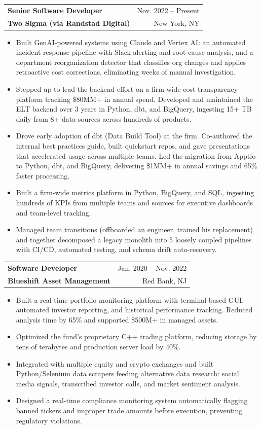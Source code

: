 \documentclass[letterpaper,11pt]{article}
\makeatletter
\newcommand{\resumeItem}[1]{
  \item\small{
    {#1 \vspace{-2pt}}
  }
}
\newcommand{\resumeSubheading}[4]{
  \vspace{-2pt}\item
    \begin{tabular*}{0.97\textwidth}[t]{l@{\extracolsep{\fill}}r}
      \textbf{\normalsize #1} & {\small #2} \\
      {\small\color{sectionblue}\textbf{#3}} & {\small #4} \\
    \end{tabular*}\vspace{-7pt}
}
\newcommand{\resumeItemListStart}{\begin{itemize}\setlength{\itemsep}{0pt}}
\newcommand{\resumeItemListEnd}{\end{itemize}\vspace{-5pt}}
\makeatother
\begin{document}
    \resumeSubheading
      {Senior Software Developer}{Nov. 2022 -- Present}
      {Two Sigma (via Randstad Digital)}{New York, NY}
      \resumeItemListStart
        \resumeItem{Built GenAI-powered systems using Claude and Vertex AI: an automated incident response pipeline with Slack alerting and root-cause analysis, and a department reorganization detector that classifies org changes and applies retroactive cost corrections, eliminating weeks of manual investigation.}
        \resumeItem{Stepped up to lead the backend effort on a firm-wide cost transparency platform tracking \$80MM+ in annual spend. Developed and maintained the ELT backend over 3 years in Python, dbt, and BigQuery, ingesting 15+ TB daily from 8+ data sources across hundreds of products.}
        \resumeItem{Drove early adoption of dbt (Data Build Tool) at the firm. Co-authored the internal best practices guide, built quickstart repos, and gave presentations that accelerated usage across multiple teams. Led the migration from Apptio to Python, dbt, and BigQuery, delivering \$1MM+ in annual savings and 65\% faster processing.}
        \resumeItem{Built a firm-wide metrics platform in Python, BigQuery, and SQL, ingesting hundreds of KPIs from multiple teams and sources for executive dashboards and team-level tracking.}
        \resumeItem{Managed team transitions (offboarded an engineer, trained his replacement) and together decomposed a legacy monolith into 5 loosely coupled pipelines with CI/CD, automated testing, and schema drift auto-recovery.}
      \resumeItemListEnd
    \vspace{1pt}

    \resumeSubheading
      {Software Developer}{Jan. 2020 -- Nov. 2022}
      {Blueshift Asset Management}{Red Bank, NJ}
      \resumeItemListStart
        \resumeItem{Built a real-time portfolio monitoring platform with terminal-based GUI, automated investor reporting, and historical performance tracking. Reduced analysis time by 65\% and supported \$500M+ in managed assets.}
        \resumeItem{Optimized the fund's proprietary C++ trading platform, reducing storage by tens of terabytes and production server load by 40\%.}
        \resumeItem{Integrated with multiple equity and crypto exchanges and built Python/Selenium data scrapers feeding alternative data research: social media signals, transcribed investor calls, and market sentiment analysis.}
        \resumeItem{Designed a real-time compliance monitoring system automatically flagging banned tickers and improper trade amounts before execution, preventing regulatory violations.}
      \resumeItemListEnd
    \vspace{1pt}
\end{document}
